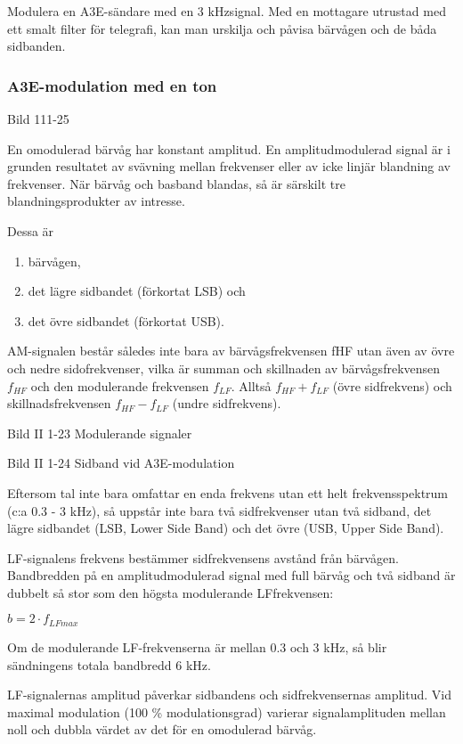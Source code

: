 Modulera en A3E-sändare med en 3 kHzsignal. Med en mottagare utrustad med ett
smalt filter för telegrafi, kan man urskilja och påvisa bärvågen och de båda sidbanden.

\subsubsection{A3E-modulation med en ton}

Bild 111-25

En omodulerad bärvåg har konstant amplitud. En amplitudmodulerad signal är i grunden
resultatet av svävning mellan frekvenser eller av icke linjär blandning av frekvenser. När 
bärvåg och basband blandas, så är särskilt tre blandningsprodukter av intresse.

Dessa är

\begin{enumerate}[label=-,noitemsep]
\item bärvågen,
\item det lägre sidbandet (förkortat LSB) och
\item det övre sidbandet (förkortat USB).
\end{enumerate}

AM-signalen består således inte bara av bärvågsfrekvensen fHF utan även av övre
och nedre sidofrekvenser, vilka är summan och skillnaden av bärvågsfrekvensen $f_{HF}$ och
den modulerande frekvensen $f_{LF}$. Alltså $f_{HF} + f_{LF}$ (övre sidfrekvens) och
skillnadsfrekvensen $f_{HF} - f_{LF}$ (undre sidfrekvens).

Bild II 1-23 Modulerande signaler

Bild II 1-24 Sidband vid A3E-modulation

Eftersom tal inte bara omfattar en enda frekvens utan ett helt frekvensspektrum (c:a
0.3 - 3 kHz), så uppstår inte bara två sidfrekvenser utan två sidband, det lägre sidbandet
(LSB, Lower Side Band) och det övre (USB, Upper Side Band).

LF-signalens frekvens bestämmer sidfrekvensens avstånd från bärvågen. Bandbredden på en
amplitudmodulerad signal med full bärvåg och två sidband är dubbelt så stor som den högsta
modulerande LFfrekvensen:

$b= 2 \cdot f_{LFmax}$

Om de modulerande LF-frekvenserna är mellan 0.3 och 3 kHz, så blir sändningens
totala bandbredd 6 kHz.

LF-signalernas amplitud påverkar sidbandens och sidfrekvensernas amplitud. Vid
maximal modulation (100 \% modulationsgrad) varierar signalamplituden mellan noll
och dubbla värdet av det för en omodulerad bärvåg.

